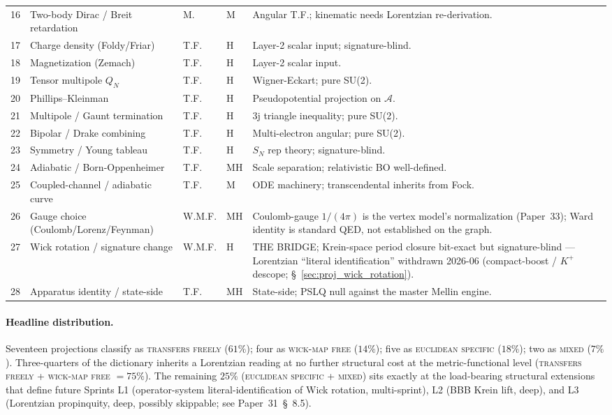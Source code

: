 \documentclass[11pt]{article}
\begin{document}
\begin{table}[h]
\begin{tabular}{p{0.4cm} p{4.3cm} p{0.8cm} p{0.5cm} p{8cm}}
16 & Two-body Dirac / Breit retardation & M. & M & Angular T.F.; kinematic needs Lorentzian re-derivation. \\
17 & Charge density (Foldy/Friar) & T.F. & H & Layer-2 scalar input; signature-blind. \\
18 & Magnetization (Zemach) & T.F. & H & Layer-2 scalar input. \\
19 & Tensor multipole $Q_N$ & T.F. & H & Wigner-Eckart; pure SU(2). \\
20 & Phillips--Kleinman & T.F. & H & Pseudopotential projection on $\mathcal{A}$. \\
21 & Multipole / Gaunt termination & T.F. & H & 3j triangle inequality; pure SU(2). \\
22 & Bipolar / Drake combining & T.F. & H & Multi-electron angular; pure SU(2). \\
23 & Symmetry / Young tableau & T.F. & H & $S_N$ rep theory; signature-blind. \\
24 & Adiabatic / Born-Oppenheimer & T.F. & MH & Scale separation; relativistic BO well-defined. \\
25 & Coupled-channel / adiabatic curve & T.F. & M & ODE machinery; transcendental inherits from Fock. \\
26 & Gauge choice (Coulomb/Lorenz/Feynman) & W.M.F. & MH & Coulomb-gauge $1/(4\pi)$ is the vertex model's normalization (Paper~33); Ward identity is standard QED, not established on the graph. \\
27 & Wick rotation / signature change & W.M.F. & H & THE BRIDGE; Krein-space period closure bit-exact but signature-blind --- Lorentzian ``literal identification'' withdrawn 2026-06 (compact-boost / $K^+$ descope; \S~\ref{sec:proj_wick_rotation}). \\
28 & Apparatus identity / state-side & T.F. & MH & State-side; PSLQ null against the master Mellin engine. \\
\bottomrule
\end{tabular}
\end{table}

\paragraph{Headline distribution.}
Seventeen projections classify as \textsc{transfers freely}
($61\%$); four as \textsc{wick-map free} ($14\%$); five as
\textsc{euclidean specific} ($18\%$); two as \textsc{mixed} ($7\%$).
Three-quarters of the dictionary inherits a Lorentzian reading at no
further structural cost at the metric-functional level
(\textsc{transfers freely} + \textsc{wick-map free} $= 75\%$).  The
remaining $25\%$ (\textsc{euclidean specific} + \textsc{mixed}) sits
exactly at the load-bearing structural extensions that define future
Sprints L1 (operator-system literal-identification of Wick rotation,
multi-sprint), L2 (BBB Krein lift, deep), and L3
(Lorentzian propinquity, deep, possibly skippable; see
Paper~31~\S~8.5).
\end{document}

